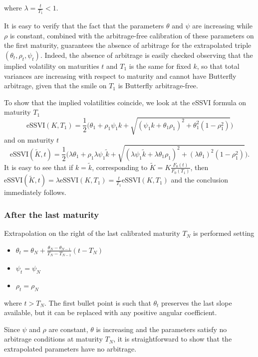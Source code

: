 \documentclass{article}
\providecommand{\tightlist}{%
      \setlength{\itemsep}{0pt}\setlength{\parskip}{0pt}}
\begin{document}
where \(\lambda=\frac{t}{T_1}<1\).

	It is easy to verify that the fact that the parameters \(\theta\) and
\(\psi\) are increasing while \(\rho\) is constant, combined with the
arbitrage-free calibration of these parameters on the first maturity,
guarantees the absence of arbitrage for the extrapolated triple
\((\theta_t,\rho_t,\psi_t)\). Indeed, the absence of arbitrage is easily
checked observing that the implied volatility on maturities \(t\) and
\(T_1\) is the same for fixed \(k\), so that total variances are
increasing with respect to maturity and cannot have Butterfly arbitrage,
given that the smile on \(T_1\) is Butterfly arbitrage-free.

To show that the implied volatilities coincide, we look at the eSSVI
formula on maturity \(T_1\)
\[\text{eSSVI}(K,T_1) = \frac{1}{2}\bigl(\theta_1+\rho_1\psi_1 k + \sqrt{(\psi_1 k + \theta_1\rho_1)^2 + \theta_1^2(1-\rho_1^2)}\bigr)\]
and on maturity \(t\)
\[\text{eSSVI}(\tilde K,t) = \frac{1}{2}\bigl(\lambda\theta_1+\rho_1\lambda\psi_1\tilde k + \sqrt{(\lambda\psi_1\tilde k + \lambda\theta_1\rho_1)^2 + (\lambda\theta_1)^2(1-\rho_1^2)}\bigr).\]
It is easy to see that if \(k=\tilde k\), corresponding to
\(\tilde K = K\frac{F_0(t)}{F_0(T_1)}\), then
\(\text{eSSVI}(\tilde K,t) = \lambda \text{eSSVI}(K,T_1) = \frac{t}{T_1}\text{eSSVI}(K,T_1)\)
and the conclusion immediately follows.

	\hypertarget{after-the-last-maturity}{%
\subsubsection{After the last maturity}\label{after-the-last-maturity}}

	Extrapolation on the right of the last calibrated maturity \(T_N\) is
performed setting

\begin{itemize}
\tightlist
\item
  \(\theta_t = \theta_N + \frac{\theta_N-\theta_{N-1}}{T_N-T_{N-1}}(t-T_N)\)
\item
  \(\psi_t = \psi_N\)
\item
  \(\rho_t = \rho_N\)
\end{itemize}

where \(t>T_N\). The first bullet point is such that \(\theta_t\)
preserves the last slope available, but it can be replaced with any
positive angular coefficient.

	Since \(\psi\) and \(\rho\) are constant, \(\theta\) is increasing and
the parameters satisfy no arbitrage conditions at maturity \(T_N\), it
is straightforward to show that the extrapolated parameters have no
arbitrage.
\end{document}
